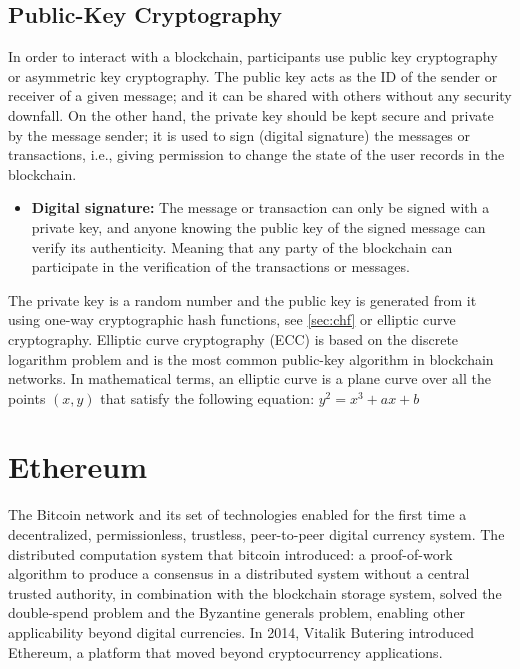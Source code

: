 \documentclass[11pt,a4paper]{report}
\begin{document}
\subsection{Public-Key Cryptography}\label{publickey}
In order to interact with a blockchain, participants use public key cryptography or asymmetric key cryptography\cite{book:pkc}. The public key acts as the ID of the sender or receiver of a given message; and it can be shared with others without any security downfall. On the other hand, the private key should be kept secure and private by the message sender; it is used to sign (digital signature) the messages or transactions, i.e., giving permission to change the state of the user records in the blockchain.
\begin{itemize}
	\item[] \textbf{Digital signature:} The message or transaction can only be signed with a private key, and anyone knowing the public key of the signed message can verify  its authenticity. Meaning that any party of the blockchain can participate in the verification of the transactions or messages.
\end{itemize}
The private key is a random number and the public key is generated from it using one-way cryptographic hash functions, see \ref{sec:chf} or elliptic curve cryptography\cite{book:pkc}\cite{wiki:ecc}. Elliptic curve cryptography (ECC) is based on the discrete logarithm problem\cite{dlproblem} and is the most common public-key algorithm in blockchain networks.
In mathematical terms, an elliptic curve is a plane curve over all the points $(x, y)$ that satisfy the following equation:  $ y^2 = x^3 +ax + b $


\section{Ethereum}\label{sec:eth}
The Bitcoin\cite{bitcoin}\cite{book:masteringBTC} network and its set of technologies enabled for the first time a decentralized, permissionless, trustless, peer-to-peer digital currency system. The distributed computation system that bitcoin introduced: a proof-of-work algorithm to produce a consensus in a distributed system without a central trusted authority, in combination with the blockchain storage system, solved the double-spend problem\cite{doublespend} and the Byzantine generals problem\cite{bizantine}, enabling other applicability beyond digital currencies.  In 2014, Vitalik Butering introduced Ethereum\cite{article:eth}, a platform that moved beyond cryptocurrency applications.
\end{document}

